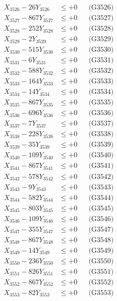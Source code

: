 \documentclass[a4paper,10pt]{article}
\begin{document}
{\begin{align}
X_{3526} - 26Y_{3526} &\leq +0 && \text{(G3526)} \\
X_{3527} - 867Y_{3527} &\leq +0 && \text{(G3527)} \\
X_{3528} - 252Y_{3528} &\leq +0 && \text{(G3528)} \\
X_{3529} - 2Y_{3529} &\leq +0 && \text{(G3529)} \\
X_{3530} - 515Y_{3530} &\leq +0 && \text{(G3530)} \\
\allowbreak
X_{3531} - 6Y_{3531} &\leq +0 && \text{(G3531)} \\
X_{3532} - 588Y_{3532} &\leq +0 && \text{(G3532)} \\
X_{3533} - 164Y_{3533} &\leq +0 && \text{(G3533)} \\
X_{3534} - 14Y_{3534} &\leq +0 && \text{(G3534)} \\
X_{3535} - 867Y_{3535} &\leq +0 && \text{(G3535)} \\
X_{3536} - 696Y_{3536} &\leq +0 && \text{(G3536)} \\
X_{3537} - 7Y_{3537} &\leq +0 && \text{(G3537)} \\
X_{3538} - 228Y_{3538} &\leq +0 && \text{(G3538)} \\
X_{3539} - 35Y_{3539} &\leq +0 && \text{(G3539)} \\
X_{3540} - 109Y_{3540} &\leq +0 && \text{(G3540)} \\
\allowbreak
X_{3541} - 867Y_{3541} &\leq +0 && \text{(G3541)} \\
X_{3542} - 578Y_{3542} &\leq +0 && \text{(G3542)} \\
X_{3543} - 9Y_{3543} &\leq +0 && \text{(G3543)} \\
X_{3544} - 582Y_{3544} &\leq +0 && \text{(G3544)} \\
X_{3545} - 803Y_{3545} &\leq +0 && \text{(G3545)} \\
X_{3546} - 109Y_{3546} &\leq +0 && \text{(G3546)} \\
X_{3547} - 355Y_{3547} &\leq +0 && \text{(G3547)} \\
X_{3548} - 867Y_{3548} &\leq +0 && \text{(G3548)} \\
X_{3549} - 14Y_{3549} &\leq +0 && \text{(G3549)} \\
X_{3550} - 236Y_{3550} &\leq +0 && \text{(G3550)} \\
\allowbreak
X_{3551} - 826Y_{3551} &\leq +0 && \text{(G3551)} \\
X_{3552} - 867Y_{3552} &\leq +0 && \text{(G3552)} \\
X_{3553} - 82Y_{3553} &\leq +0 && \text{(G3553)} \\

\end{align}}
\end{document}
